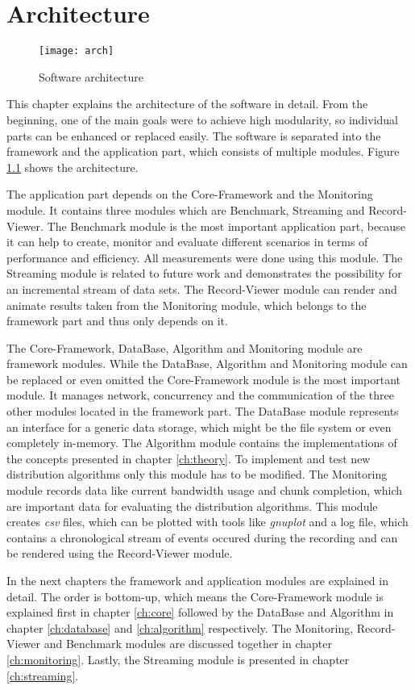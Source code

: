 \chapter{Architecture}
\label{ch:arch}

\begin{figure}[ht]
	\centering
	\texttt{[image: arch]}
	\caption{Software architecture}
	\label{fig:arch}
\end{figure}

This chapter explains the architecture of the software in detail. From the beginning, one of the main goals were to achieve high modularity, so individual parts can be enhanced or replaced easily. The software is separated into the framework and the application part, which consists of multiple modules. Figure \ref{fig:arch} shows the architecture. 

The application part depends on the Core-Framework and the Monitoring module. It contains three modules which are Benchmark, Streaming and Record-Viewer. The Benchmark module is the most important application part, because it can help to create, monitor and evaluate different scenarios in terms of performance and efficiency. All measurements were done using this module. The Streaming module is related to future work and demonstrates the possibility for an incremental stream of data sets. The Record-Viewer module can render and animate results taken from the Monitoring module, which belongs to the framework part and thus only depends on it.

The Core-Framework, DataBase, Algorithm and Monitoring module are framework modules. While the DataBase, Algorithm and Monitoring module can be replaced or even omitted the Core-Framework module is the most important module. It manages network, concurrency and the communication of the three other modules located in the framework part. The DataBase module represents an interface for a generic data storage, which might be the file system or even completely in-memory. The Algorithm module contains the implementations of the concepts presented in chapter \ref{ch:theory}. To implement and test new distribution algorithms only this module has to be modified. The Monitoring module records data like current bandwidth usage and chunk completion, which are important data for evaluating the distribution algorithms. This module creates \emph{csv} files, which can be plotted with tools like \emph{gnuplot} and a log file, which contains a chronological stream of events occured during the recording and can be rendered using the Record-Viewer module.

In the next chapters the framework and application modules are explained in detail. The order is bottom-up, which means the Core-Framework module is explained first in chapter \ref{ch:core} followed by the DataBase and Algorithm in chapter \ref{ch:database} and \ref{ch:algorithm} respectively. The Monitoring, Record-Viewer and Benchmark modules are discussed together in chapter \ref{ch:monitoring}. Lastly, the Streaming module is presented in chapter \ref{ch:streaming}.